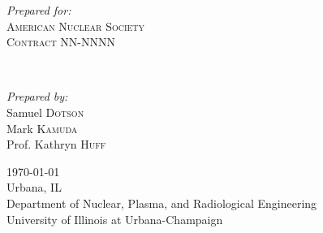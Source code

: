 \documentclass[11pt]{article}
\begin{document}
\begin{titlepage}
	
	\begin{minipage}{0.4\textwidth}
		\begin{flushleft}
			\large
			\textit{Prepared for:}\\
			\textsc{American Nuclear Society}\\ %
                        \textsc{Contract} NN-NNNN\\ %
                \end{flushleft}
	\end{minipage}
	~
	\begin{minipage}{0.4\textwidth}
		\begin{flushright}
			\large
			\textit{Prepared by:}\\
			Samuel \textsc{Dotson}\\ %
			Mark \textsc{Kamuda}\\ %
			Prof. Kathryn \textsc{Huff} %
		\end{flushright}
	\end{minipage}
	
	
	
	\vfill\vfill\vfill %
	
	{\large\today}\\ %
        \vfill
	{\large Urbana, IL}\\ %
        {\large Department of Nuclear, Plasma, and Radiological Engineering\\
        University of Illinois at Urbana-Champaign}\\ %
	
	
	
	\vfill %
	
\end{titlepage}

\end{document}
